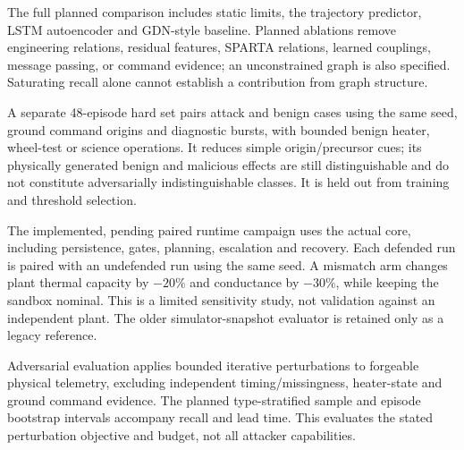 \documentclass[10pt,a4paper,twocolumn]{article}
\begin{document}
The full planned comparison includes static limits, the trajectory predictor, LSTM autoencoder and GDN-style baseline. Planned ablations remove engineering relations, residual features, SPARTA relations, learned couplings, message passing, or command evidence; an unconstrained graph is also specified. Saturating recall alone cannot establish a contribution from graph structure.

A separate 48-episode hard set pairs attack and benign cases using the same seed, ground command origins and diagnostic bursts, with bounded benign heater, wheel-test or science operations. It reduces simple origin/precursor cues; its physically generated benign and malicious effects are still distinguishable and do not constitute adversarially indistinguishable classes. It is held out from training and threshold selection.

The implemented, pending paired runtime campaign uses the actual core, including persistence, gates, planning, escalation and recovery. Each defended run is paired with an undefended run using the same seed. A mismatch arm changes plant thermal capacity by $-20\%$ and conductance by $-30\%$, while keeping the sandbox nominal. This is a limited sensitivity study, not validation against an independent plant. The older simulator-snapshot evaluator is retained only as a legacy reference.

Adversarial evaluation applies bounded iterative perturbations to forgeable physical telemetry, excluding independent timing/missingness, heater-state and ground command evidence. The planned type-stratified sample and episode bootstrap intervals accompany recall and lead time. This evaluates the stated perturbation objective and budget, not all attacker capabilities.
\end{document}

